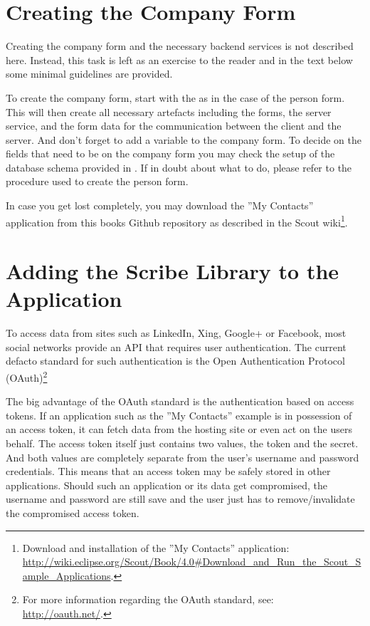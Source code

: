 \documentclass[a4paper,10pt,twoside]{book}
\begin{document}
\section{Creating the Company Form}

Creating the company form and the necessary backend services is not described here.
Instead, this task is left as an exercise to the reader and in the text below some minimal guidelines are provided.

To create the company form, start with the  as in the case of the person form. 
This will then create all necessary artefacts including the forms, the server service, and the form data for the communication between the client and the server. 
And don't forget to add a  variable to the company form. 
To decide on the fields that need to be on the company form you may check the setup of the database schema provided in . 
If in doubt about what to do, please refer to the procedure used to create the person form. 

In case you get lost completely, you may download the ''My Contacts'' application from this books Github repository as described in the Scout wiki\footnote{
Download and installation of the ''My Contacts'' application: \url{http://wiki.eclipse.org/Scout/Book/4.0\#Download_and_Run_the_Scout_Sample_Applications}.
}.

\section{Adding the Scribe Library to the Application}

To access data from sites such as LinkedIn, Xing, Google+ or Facebook, most social networks provide an API that requires user authentication. 
The current defacto standard for such authentication is the Open Authentication Protocol (OAuth)\footnote{
For more information regarding the OAuth standard, see: \url{http://oauth.net/}.
} 

The big advantage of the OAuth standard is the authentication based on access tokens.  
If an application such as the ''My Contacts'' example is in possession of an access token, it can fetch data from the hosting site or even act on the users behalf. 
The access token itself just contains two values, the token and the secret.
And both values are completely separate from the user's username and password credentials. 
This means that an access token may be safely stored in other applications. 
Should such an application or its data get compromised, the username and password are still save and the user just has to remove/invalidate the compromised access token.  
\end{document}
